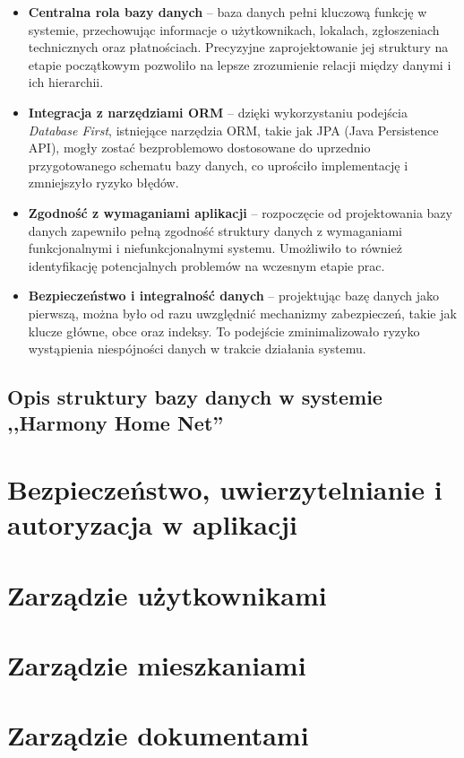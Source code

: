 \begin{itemize}
    \item \textbf{Centralna rola bazy danych} -- baza danych pełni kluczową funkcję w systemie, przechowując informacje o użytkownikach, lokalach, zgłoszeniach technicznych oraz płatnościach. Precyzyjne zaprojektowanie jej struktury na etapie początkowym pozwoliło na lepsze zrozumienie relacji między danymi i ich hierarchii.
    \item \textbf{Integracja z narzędziami ORM} -- dzięki wykorzystaniu podejścia \emph{Database First}, istniejące narzędzia ORM, takie jak JPA (Java Persistence API), mogły zostać bezproblemowo dostosowane do uprzednio przygotowanego schematu bazy danych, co uprościło implementację i zmniejszyło ryzyko błędów.
    \item \textbf{Zgodność z wymaganiami aplikacji} -- rozpoczęcie od projektowania bazy danych zapewniło pełną zgodność struktury danych z wymaganiami funkcjonalnymi i niefunkcjonalnymi systemu. Umożliwiło to również identyfikację potencjalnych problemów na wczesnym etapie prac.
    \item \textbf{Bezpieczeństwo i integralność danych} -- projektując bazę danych jako pierwszą, można było od razu uwzględnić mechanizmy zabezpieczeń, takie jak klucze główne, obce oraz indeksy. To podejście zminimalizowało ryzyko wystąpienia niespójności danych w trakcie działania systemu.
\end{itemize}

\subsection{Opis struktury bazy danych w systemie ,,Harmony Home Net''}

\section{Bezpieczeństwo, uwierzytelnianie i autoryzacja w aplikacji}

\section{Zarządzie użytkownikami}

\section{Zarządzie mieszkaniami}

\section{Zarządzie dokumentami}

